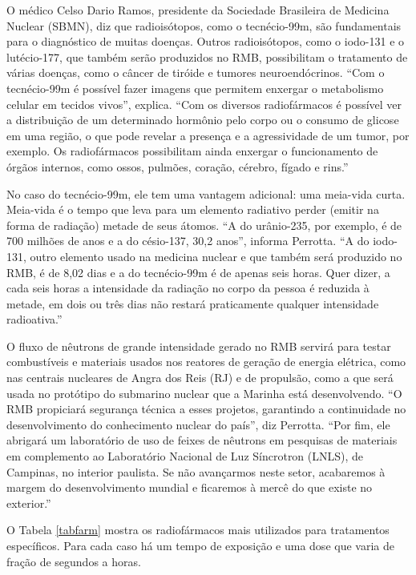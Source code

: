 \documentclass[11pt]{article}
\begin{document}
\begin{multicols}{2}
O médico Celso Dario Ramos, presidente da Sociedade Brasileira de Medicina Nuclear (SBMN), diz que radioisótopos, como o tecnécio-99m, são fundamentais para o diagnóstico de muitas doenças. Outros radioisótopos, como o iodo-131 e o lutécio-177, que também serão produzidos no RMB, possibilitam o tratamento de várias doenças, como o câncer de tiróide e tumores neuroendócrinos. “Com o tecnécio-99m é possível fazer imagens que permitem enxergar o metabolismo celular em tecidos vivos”, explica. “Com os diversos radiofármacos é possível ver a distribuição de um determinado hormônio pelo corpo ou o consumo de glicose em uma região, o que pode revelar a presença e a agressividade de um tumor, por exemplo. Os radiofármacos possibilitam ainda enxergar o funcionamento de órgãos internos, como ossos, pulmões, coração, cérebro, fígado e rins.”

No caso do tecnécio-99m, ele tem uma vantagem adicional: uma meia-vida curta. Meia-vida é o tempo que leva para um elemento radiativo perder (emitir na forma de radiação) metade de seus átomos. “A do urânio-235, por exemplo, é de 700 milhões de anos e a do césio-137, 30,2 anos”, informa Perrotta. “A do iodo-131, outro elemento usado na medicina nuclear e que também será produzido no RMB, é de 8,02 dias e a do tecnécio-99m é de apenas seis horas. Quer dizer, a cada seis horas a intensidade da radiação no corpo da pessoa é reduzida à metade, em dois ou três dias não restará praticamente qualquer intensidade radioativa.”

O fluxo de nêutrons de grande intensidade gerado no RMB servirá para testar combustíveis e materiais usados nos reatores de geração de energia elétrica, como nas centrais nucleares de Angra dos Reis (RJ) e de propulsão, como a que será usada no protótipo do submarino nuclear que a Marinha está desenvolvendo. “O RMB propiciará segurança técnica a esses projetos, garantindo a continuidade no desenvolvimento do conhecimento nuclear do país”, diz Perrotta. “Por fim, ele abrigará um laboratório de uso de feixes de nêutrons em pesquisas de materiais em complemento ao Laboratório Nacional de Luz Síncrotron (LNLS), de Campinas, no interior paulista. Se não avançarmos neste setor, acabaremos à margem do desenvolvimento mundial e ficaremos à mercê do que existe no exterior.”

\end{multicols}


O Tabela \ref{tabfarm} mostra os radiofármacos mais utilizados para tratamentos específicos. Para cada caso há um tempo de exposição e uma dose que varia de fração de segundos a horas.
\end{document}
